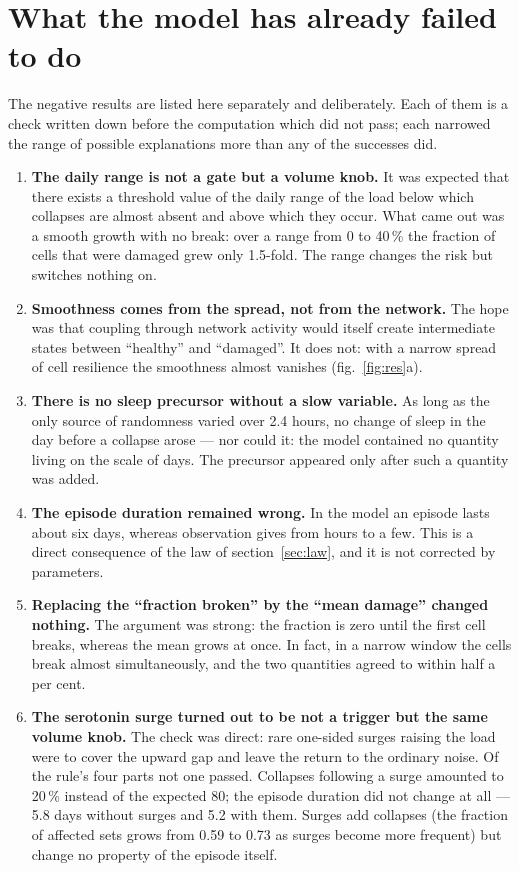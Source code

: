 \section{What the model has already failed to do}\label{sec:fail}
The negative results are listed here separately and deliberately. Each of them is a check written down before the computation which did not pass; each narrowed the range of possible explanations more than any of the successes did.

\begin{enumerate}
\item \textbf{The daily range is not a gate but a volume knob.} It was expected that there exists a threshold value of the daily range of the load below which collapses are almost absent and above which they occur. What came out was a smooth growth with no break: over a range from 0 to 40\,\% the fraction of cells that were damaged grew only 1.5-fold. The range changes the risk but switches nothing on.\tD
\item \textbf{Smoothness comes from the spread, not from the network.} The hope was that coupling through network activity would itself create intermediate states between ``healthy'' and ``damaged''. It does not: with a narrow spread of cell resilience the smoothness almost vanishes (fig.~\ref{fig:res}a).\tD
\item \textbf{There is no sleep precursor without a slow variable.} As long as the only source of randomness varied over 2.4 hours, no change of sleep in the day before a collapse arose --- nor could it: the model contained no quantity living on the scale of days. The precursor appeared only after such a quantity was added.\tD
\item \textbf{The episode duration remained wrong.} In the model an episode lasts about six days, whereas observation gives from hours to a few. This is a direct consequence of the law of section~\ref{sec:law}, and it is not corrected by parameters.\tD
\item \textbf{Replacing the ``fraction broken'' by the ``mean damage'' changed nothing.} The argument was strong: the fraction is zero until the first cell breaks, whereas the mean grows at once. In fact, in a narrow window the cells break almost simultaneously, and the two quantities agreed to within half a per cent.\tD
\item \textbf{The serotonin surge turned out to be not a trigger but the same volume knob.} The check was direct: rare one-sided surges raising the load were to cover the upward gap and leave the return to the ordinary noise. Of the rule's four parts not one passed. Collapses following a surge amounted to 20\,\% instead of the expected 80; the episode duration did not change at all --- 5.8 days without surges and 5.2 with them. Surges add collapses (the fraction of affected sets grows from 0.59 to 0.73 as surges become more frequent) but change no property of the episode itself.\tD

\end{enumerate}
